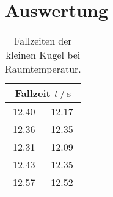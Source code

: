 \section{Auswertung}
\label{sec:Auswertung}

\begin{table}
    \centering
    \caption{Fallzeiten der kleinen Kugel bei Raumtemperatur.}
    \label{tab:mess_klKugel_raum}
    \begin{tabular}{c c}
        \toprule
        \multicolumn{2}{c}{Fallzeit $t\:/\:\si{\second}$} \\
        \midrule
        12.40 & 12.17 \\
        12.36 & 12.35 \\
        12.31 & 12.09 \\
        12.43 & 12.35 \\
        12.57 & 12.52 \\
        \bottomrule
    \end{tabular}    
\end{table}

